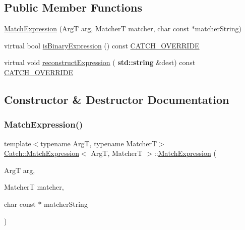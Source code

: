 \subsection*{Public Member Functions}
\begin{DoxyCompactItemize}
\item 
\hyperlink{class_catch_1_1_match_expression_a506f25bad7970cb35f9dbe54763a8ca5}{Match\+Expression} (ArgT arg, MatcherT matcher, char const $\ast$matcher\+String)
\item 
virtual bool \hyperlink{class_catch_1_1_match_expression_ac4edf6e9a6e5762a487db1486d0d1f45}{is\+Binary\+Expression} () const \hyperlink{catch_8hpp_a8ecdce4d3f57835f707915ae831eb847}{C\+A\+T\+C\+H\+\_\+\+O\+V\+E\+R\+R\+I\+DE}
\item 
virtual void \hyperlink{class_catch_1_1_match_expression_a4410a93bc5b8241eb2502f400fce7ec4}{reconstruct\+Expression} (\textbf{ std\+::string} \&dest) const \hyperlink{catch_8hpp_a8ecdce4d3f57835f707915ae831eb847}{C\+A\+T\+C\+H\+\_\+\+O\+V\+E\+R\+R\+I\+DE}
\end{DoxyCompactItemize}


\subsection{Constructor \& Destructor Documentation}
\mbox{\label{class_catch_1_1_match_expression_a506f25bad7970cb35f9dbe54763a8ca5}} 
\subsubsection{\texorpdfstring{Match\+Expression()}{MatchExpression()}}
{\footnotesize\ttfamily template$<$typename ArgT, typename MatcherT$>$ \\
\hyperlink{class_catch_1_1_match_expression}{Catch\+::\+Match\+Expression}$<$ ArgT, MatcherT $>$\+::\hyperlink{class_catch_1_1_match_expression}{Match\+Expression} (\begin{DoxyParamCaption}\item[{ArgT}]{arg,  }\item[{MatcherT}]{matcher,  }\item[{char const $\ast$}]{matcher\+String }\end{DoxyParamCaption})\hspace{0.3cm}{\ttfamily [inline]}}



